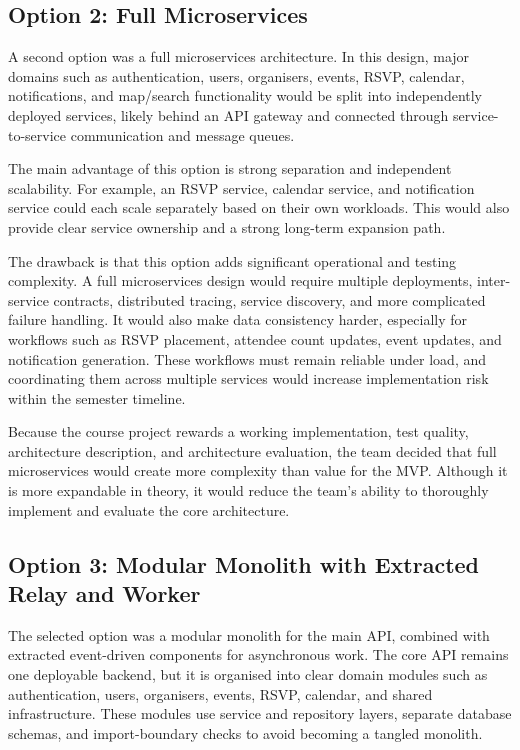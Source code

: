 \subsection{Option 2: Full Microservices}

A second option was a full microservices architecture. In this design, major domains such as authentication, users, organisers, events, RSVP, calendar, notifications, and map/search functionality would be split into independently deployed services, likely behind an API gateway and connected through service-to-service communication and message queues.

The main advantage of this option is strong separation and independent scalability. For example, an RSVP service, calendar service, and notification service could each scale separately based on their own workloads. This would also provide clear service ownership and a strong long-term expansion path.

The drawback is that this option adds significant operational and testing complexity. A full microservices design would require multiple deployments, inter-service contracts, distributed tracing, service discovery, and more complicated failure handling. It would also make data consistency harder, especially for workflows such as RSVP placement, attendee count updates, event updates, and notification generation. These workflows must remain reliable under load, and coordinating them across multiple services would increase implementation risk within the semester timeline.

Because the course project rewards a working implementation, test quality, architecture description, and architecture evaluation, the team decided that full microservices would create more complexity than value for the MVP. Although it is more expandable in theory, it would reduce the team's ability to thoroughly implement and evaluate the core architecture.

\subsection{Option 3: Modular Monolith with Extracted Relay and Worker}

The selected option was a modular monolith for the main API, combined with extracted event-driven components for asynchronous work. The core API remains one deployable backend, but it is organised into clear domain modules such as authentication, users, organisers, events, RSVP, calendar, and shared infrastructure. These modules use service and repository layers, separate database schemas, and import-boundary checks to avoid becoming a tangled monolith.

